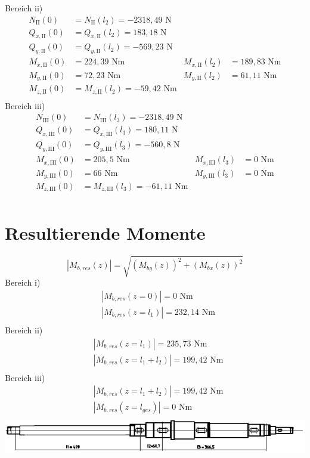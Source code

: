 Bereich ii)
\begin{align*}
	N_{\mathrm{II}} (0) &= N_{\mathrm{II}} (l_2) = -2318,49 \text{ N}\\
	Q_{x,\mathrm{II}} (0) &= Q_{x,\mathrm{II}} (l_2) = 183,18\text{ N}\\
	Q_{y,\mathrm{II}} (0) &= Q_{y,\mathrm{II}} (l_2) = -569,23\text{ N}\\
	M_{x,\mathrm{II}} (0) &= 224,39\text{ Nm} & M_{x,\mathrm{II}} (l_2) &= 189,83\text{ Nm}\\
	M_{y,\mathrm{II}} (0) &=  72,23\text{ Nm} & M_{y,\mathrm{II}} (l_2) &= 61,11\text{ Nm}\\
	M_{z,\mathrm{II}} (0) &= M_{z,\mathrm{II}} (l_2) = -59,42\text{ Nm}\\
\end{align*}
Bereich iii)
\begin{align*}
	N_{\mathrm{III}} (0) &= N_{\mathrm{III}} (l_3) = -2318,49 \text{ N}\\
	Q_{x,\mathrm{III}} (0) &= Q_{x,\mathrm{III}} (l_3) = 180,11\text{ N}\\
	Q_{y,\mathrm{III}} (0) &= Q_{y,\mathrm{III}} (l_3) = -560,8\text{ N}\\
	M_{x,\mathrm{III}} (0) &= 205,5\text{ Nm} & M_{x,\mathrm{III}} (l_3) &= 0\text{ Nm}\\
	M_{y,\mathrm{III}} (0) &=  66\text{ Nm} & M_{y,\mathrm{III}} (l_3) &= 0\text{ Nm}\\
	M_{z,\mathrm{III}} (0) &= M_{z,\mathrm{III}} (l_3) = -61,11\text{ Nm}\\
\end{align*}
\newpage
\section{Resultierende Momente}
\[
	|M_{b,res}(z)| = \sqrt{\left( M_{by}(z) \right)^2 + \left( M_{bx}(z) \right)^2 }
\]
Bereich i)
\begin{align*}
	&|M_{b,res}(z=0)| = 0 \text{ Nm} \\
	&|M_{b,res}(z=l_1)| = 232,14 \text{ Nm} \\
\end{align*}
Bereich ii)
\begin{align*}
	&|M_{b,res}(z=l_1)| = 235,73 \text{ Nm} \\
	&|M_{b,res}(z=l_1+l_2)| = 199,42 \text{ Nm} \\
\end{align*}
Bereich iii)
\begin{align*}
	&|M_{b,res}(z=l_1+l_2)| = 199,42 \text{ Nm} \\
	&|M_{b,res}(z=l_{ges})| = 0 \text{ Nm} \\
\end{align*}
\includegraphics[width=\textwidth,keepaspectratio]{figures/Welle1klein.png}